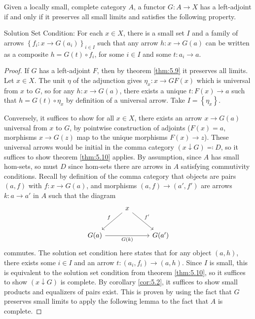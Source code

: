 \begin{theorem}\label{thm:5.11}
	Given a locally small, complete category $A$, a functor $G : A \to X$ has a left-adjoint if and only if it preserves all small limits and satisfies the following property.

	Solution Set Condition: For each $x\in X$, there is a small set $I$ and a family of arrows $\left\{ f_i : x \to G(a_i) \right\}_{i\in I} $ such that any arrow $h : x \to G(a)$ can be written as a composite $h=G(t)\circ f_i$, for some $i\in I$ and some $t : a_i \to a$.
\end{theorem}
\begin{proof}
	If $G$ has a left-adjoint $F$, then by theorem \ref{thm:5.9} it preserves all limits. Let $x\in X$. The unit $\eta$ of the adjunction gives $\eta_x : x \to GF(x)$ which is universal from $x$ to $G$, so for any $h : x \to G(a)$, there exists a unique $t : F(x) \to a$ such that $h=G(t)\circ \eta_x$ by definition of a universal arrow. Take $I=\left\{ \eta_x \right\} $.

	Conversely, it suffices to show for all $x\in X$, there exists an arrow $x \to G(a)$ universal from $x$ to $G$, by pointwise construction of adjoints ($F(x)=a$, morphisms $x\to G(z)$ map to the unique morphisms $F(x)\to z$). These universal arrows would be initial in the comma category $(x\downarrow G)\eqqcolon D$, so it suffices to show theorem \ref{thm:5.10} applies. By assumption, since $A$ has small hom-sets, so must $D$ since hom-sets there are arrows in $A$ satisfying commutivity conditions. Recall by definition of the comma category that objects are pairs $(a,f)$ with $f : x \to G(a)$, and morphisms $(a,f)\to (a',f')$ are arrows $k : a \to a'$ in $A$ such that the diagram
	\[\begin{tikzcd}[row sep = 2.5em, column sep = 2.5em]
	 & x\ar[" f "', dl] \ar[" f' ", dr]  &  \\
	G(a)\ar[" G(k) "', rr]  &  & G(a')
	\end{tikzcd}\]
	commutes. The solution set condition here states that for any object $(a,h)$, there exists some $i\in I$ and an arrow $t : (a_i,f_i)\to (a,h)$. Since $I$ is small, this is equivalent to the solution set condition from theorem \ref{thm:5.10}, so it suffices to show $(x\downarrow G)$ is complete. By corollary \ref{cor:5.2}, it suffices to show small products and equalizers of pairs exist. This is proven by using the fact that $G$ preserves small limits to apply the following lemma to the fact that $A$ is complete.
\end{proof}

